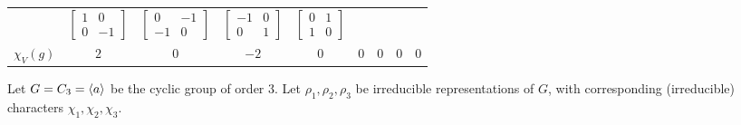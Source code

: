 \begin{example}
\begin{table}[H]
\begin{tabular}{|c|cccccccc|}
            &
            $\begin{bmatrix} 1 & 0 \\ 0 & -1 \end{bmatrix}$
            &
            $\begin{bmatrix} 0 & -1 \\ -1 & 0 \end{bmatrix}$
            &
            $\begin{bmatrix} -1 & 0 \\ 0 & 1 \end{bmatrix}$
            &
            $\begin{bmatrix} 0 & 1 \\ 1 & 0 \end{bmatrix}$
            \\
            $\chi_V(g)$ & $2$ & $0$ & $-2$ & $0$ & $0$ & $0$ & $0$ & $0$ \\
            \hline
        \end{tabular}
    \end{table}
\end{example}

\begin{example}
    Let $G = C_3 = \left\langle a \right\rangle$ be the cyclic group of order $3$. Let $\rho_1, \rho_2, \rho_3$ be irreducible representations of $G$, with corresponding (irreducible) characters $\chi_1, \chi_2, \chi_3$.
\end{example}
